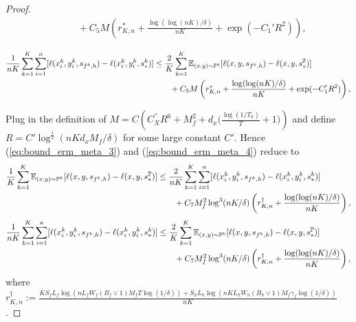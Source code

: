 \documentclass[11pt]{article}
\numberwithin{equation}{section}
\renewcommand{\P}{\mathbb{P}}
\renewcommand{\eqref}[1]{(\ref{#1})}
\begin{document}
\begin{proof}
\begin{equation}
\begin{aligned}
            &\qquad + C_5M\left(r_{K,n}^*+\frac{\log(\log(nK)/\delta)}{nK}+\exp(-C_1'R^2)\right), \\
        \end{aligned}
    \end{equation}
    \begin{equation}\label{eq:bound_erm_meta_4}
        \begin{aligned}
            \frac{1}{nK}\sum_{k=1}^K\sum_{i=1}^n [\ell(x_i^k,y_i^k,s_{f^k,h})-\ell(x_i^k,y_i^k,s_*^k)]
            &\leq \frac{2}{K}\sum_{k=1}^K\E_{(x,y)\sim\P^k} [\ell(x,y,s_{f^k,h})-\ell(x,y,s_*^\P)] \\
            &\qquad + C_5M\left(r_{K,n}^*+\frac{\log(\log(nK)/\delta)}{nK}+\exp(-C_1'R^2)\right), \\
        \end{aligned}
    \end{equation}
    
    Plug in the definition of $M=C\left(C_X^{''}R^6+M_f^2+d_x\Big(\frac{\log(1/T_0)}{T}+1\Big)\right)$ and define $R=C'\log^{\frac{1}{2}}(nKd_xM_f/\delta)$ for some large constant $C'$. Hence \eqref{eq:bound_erm_meta_3} and \eqref{eq:bound_erm_meta_4} reduce to
    \begin{equation}
        \begin{aligned}
            \frac{1}{K}\sum_{k=1}^K\E_{(x,y)\sim\P^k} [\ell(x,y,s_{f^k,h})-\ell(x,y,s_*^\P)]
            &\leq \frac{2}{nK}\sum_{k=1}^K\sum_{i=1}^n [\ell(x_i^k,y_i^k,s_{f^k,h})-\ell(x_i^k,y_i^k,s_*^k)] \\
            &\qquad + C_7M_f^2\log^3(nK/\delta)\left(r_{K,n}^\dagger+\frac{\log(\log(nK)/\delta)}{nK}\right),
        \end{aligned}
    \end{equation}
    \begin{equation}
        \begin{aligned}
            \frac{1}{nK}\sum_{k=1}^K\sum_{i=1}^n [\ell(x_i^k,y_i^k,s_{f^k,h})-\ell(x_i^k,y_i^k,s_*^k)]
            &\leq \frac{2}{K}\sum_{k=1}^K\E_{(x,y)\sim\P^k} [\ell(x,y,s_{f^k,h})-\ell(x,y,s_*^\P)] \\
            &\qquad + C_7M_f^2\log^3(nK/\delta)\left(r_{K,n}^\dagger+\frac{\log(\log(nK)/\delta)}{nK}\right),
        \end{aligned}
    \end{equation}
    where $r_{K,n}^\dagger:=\frac{KS_fL_f\log\left(nL_fW_f(B_f\vee 1)M_fT\log(1/\delta)\right)+S_hL_h\log\left(nKL_hW_h(B_h\vee 1)M_f\gamma_f\log(1/\delta)\right)}{nK}$.


\end{proof}
\end{document}

